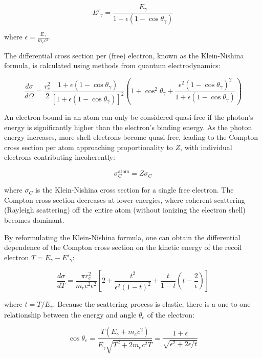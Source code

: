 \begin{equation}\label{diffeq}
E'_\gamma = \frac{E_\gamma}{1 + \epsilon (1 - \cos \theta_\gamma)}
\end{equation}

where $\epsilon = \frac{E_\gamma}{m_e c^2}$.

The differential cross section per (free) electron, known as the 
Klein-Nishina formula, is calculated using methods from quantum electrodynamics:

\begin{equation}\label{kleinnishina}
\frac{d\sigma}{d\Omega} = \frac{r_e^2}{2} \frac{1 + \epsilon (1 - \cos \theta_\gamma)}{[1 + \epsilon (1 - \cos \theta_\gamma)]^2} \left(1 + \cos^2 \theta_\gamma + \frac{\epsilon^2 (1 - \cos \theta_\gamma)^2}{1 + \epsilon (1 - \cos \theta_\gamma)} \right)
\end{equation}

An electron bound in an atom can only be considered quasi-free 
if the photon's energy is significantly higher than the electron's 
binding energy. As the photon energy increases, more shell electrons 
become quasi-free, leading to the Compton cross section per atom 
approaching proportionality to $Z$, with individual electrons 
contributing incoherently:

\begin{equation}
\sigma_C^{\text{atom}} = Z\sigma_C
\end{equation}

where $\sigma_C$ is the Klein-Nishina cross section for a 
single free electron. The Compton cross section decreases at 
lower energies, where coherent scattering (Rayleigh scattering) 
off the entire atom (without ionizing the electron shell) becomes dominant.

By reformulating the Klein-Nishina formula, one can obtain the 
differential dependence of the Compton cross section on the 
kinetic energy of the recoil electron $T = E_\gamma - E'_\gamma$:

\begin{equation}
\frac{d\sigma}{dT} = \frac{\pi r_e^2}{m_e c^2 \epsilon^2} \left[2 + \frac{t^2}{\epsilon^2 (1 - t)^2} + \frac{t}{1 - t}\left(t - \frac{2}{\epsilon}\right)\right]
\end{equation}

where $t = T/E_\gamma$. Because the scattering process is 
elastic, there is a one-to-one relationship between the 
energy and angle $\theta_e$ of the electron:

\begin{equation}
\cos \theta_e = \frac{T(E_\gamma + m_e c^2)}{E_\gamma \sqrt{T^2 + 2m_ec^2 T}} = \frac{1 + \epsilon}{\sqrt{\epsilon^2 + 2\epsilon/t}}
\end{equation}

